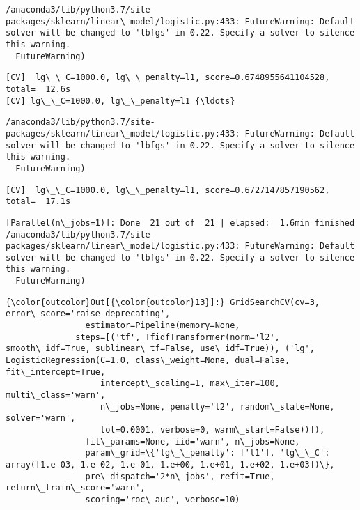 \documentclass[11pt]{article}
\begin{document}
    \begin{Verbatim}[commandchars=\\\{\}]
/anaconda3/lib/python3.7/site-packages/sklearn/linear\_model/logistic.py:433: FutureWarning: Default solver will be changed to 'lbfgs' in 0.22. Specify a solver to silence this warning.
  FutureWarning)

    \end{Verbatim}

    \begin{Verbatim}[commandchars=\\\{\}]
[CV]  lg\_\_C=1000.0, lg\_\_penalty=l1, score=0.6748955641104528, total=  12.6s
[CV] lg\_\_C=1000.0, lg\_\_penalty=l1 {\ldots}

    \end{Verbatim}

    \begin{Verbatim}[commandchars=\\\{\}]
/anaconda3/lib/python3.7/site-packages/sklearn/linear\_model/logistic.py:433: FutureWarning: Default solver will be changed to 'lbfgs' in 0.22. Specify a solver to silence this warning.
  FutureWarning)

    \end{Verbatim}

    \begin{Verbatim}[commandchars=\\\{\}]
[CV]  lg\_\_C=1000.0, lg\_\_penalty=l1, score=0.6727147857190562, total=  17.1s

    \end{Verbatim}

    \begin{Verbatim}[commandchars=\\\{\}]
[Parallel(n\_jobs=1)]: Done  21 out of  21 | elapsed:  1.6min finished
/anaconda3/lib/python3.7/site-packages/sklearn/linear\_model/logistic.py:433: FutureWarning: Default solver will be changed to 'lbfgs' in 0.22. Specify a solver to silence this warning.
  FutureWarning)

    \end{Verbatim}

\begin{Verbatim}[commandchars=\\\{\}]
{\color{outcolor}Out[{\color{outcolor}13}]:} GridSearchCV(cv=3, error\_score='raise-deprecating',
                estimator=Pipeline(memory=None,
              steps=[('tf', TfidfTransformer(norm='l2', smooth\_idf=True, sublinear\_tf=False, use\_idf=True)), ('lg', LogisticRegression(C=1.0, class\_weight=None, dual=False, fit\_intercept=True,
                   intercept\_scaling=1, max\_iter=100, multi\_class='warn',
                   n\_jobs=None, penalty='l2', random\_state=None, solver='warn',
                   tol=0.0001, verbose=0, warm\_start=False))]),
                fit\_params=None, iid='warn', n\_jobs=None,
                param\_grid=\{'lg\_\_penalty': ['l1'], 'lg\_\_C': array([1.e-03, 1.e-02, 1.e-01, 1.e+00, 1.e+01, 1.e+02, 1.e+03])\},
                pre\_dispatch='2*n\_jobs', refit=True, return\_train\_score='warn',
                scoring='roc\_auc', verbose=10)
\end{Verbatim}
            
\end{document}
